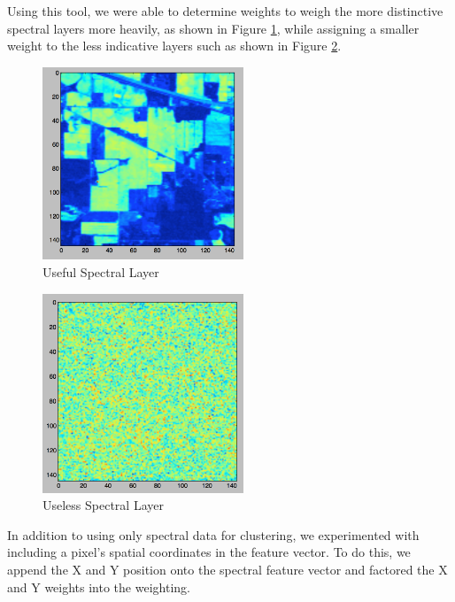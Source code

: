 \documentclass[journal]{IEEEtran}
\begin{document}
    Using this tool, we were able to determine weights to weigh the more distinctive spectral layers more heavily, as shown in Figure \ref{fig:GoodLayer}, while assigning a smaller weight to the less indicative layers such as shown in Figure \ref{fig:BadLayer}.\\


    \begin{figure}[h!]
      \centering\includegraphics[width=6cm]{images/allStarSpec.png}
      \caption{Useful Spectral Layer}
      \label{fig:GoodLayer}
    \end{figure}

    \begin{figure}[h!]
      \centering\includegraphics[width=6cm]{images/horribleSpec.png}
      \caption{Useless Spectral Layer}
      \label{fig:BadLayer}
    \end{figure}

    In addition to using only spectral data for clustering, we experimented with including a pixel’s spatial coordinates in the feature vector. To do this, we append the X and Y position onto the spectral feature vector and factored the X and Y weights into the weighting.\\
\end{document}

